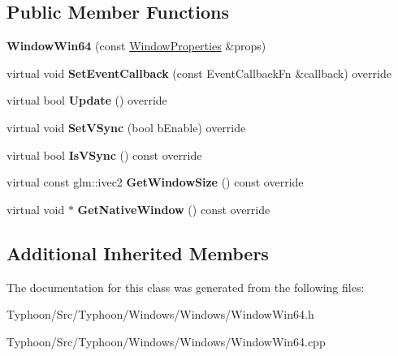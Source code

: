 \subsection*{Public Member Functions}
\begin{DoxyCompactItemize}
\item 
\mbox{\label{class_typhoon_engine_1_1_window_win64_a6f1eab7a91f37cfa49affaa9d3c53cb7}} 
{\bfseries Window\+Win64} (const \mbox{\hyperlink{struct_typhoon_engine_1_1_window_properties}{Window\+Properties}} \&props)
\item 
\mbox{\label{class_typhoon_engine_1_1_window_win64_a09ed336db951da85c24f7bdbe206a889}} 
virtual void {\bfseries Set\+Event\+Callback} (const Event\+Callback\+Fn \&callback) override
\item 
\mbox{\label{class_typhoon_engine_1_1_window_win64_ae700537b9fa361615d220761bedabacf}} 
virtual bool {\bfseries Update} () override
\item 
\mbox{\label{class_typhoon_engine_1_1_window_win64_ac1da978915106f1b733f5b6a83c62bd4}} 
virtual void {\bfseries Set\+V\+Sync} (bool b\+Enable) override
\item 
\mbox{\label{class_typhoon_engine_1_1_window_win64_a3899352b0bebac3b7e43d8279c819608}} 
virtual bool {\bfseries Is\+V\+Sync} () const override
\item 
\mbox{\label{class_typhoon_engine_1_1_window_win64_a0bee653f18b8d4a927b3758f4b65eca1}} 
virtual const glm\+::ivec2 {\bfseries Get\+Window\+Size} () const override
\item 
\mbox{\label{class_typhoon_engine_1_1_window_win64_af6b044bd05be143d38ff96b1a7c2a8f0}} 
virtual void $\ast$ {\bfseries Get\+Native\+Window} () const override
\end{DoxyCompactItemize}
\subsection*{Additional Inherited Members}


The documentation for this class was generated from the following files\+:\begin{DoxyCompactItemize}
\item 
Typhoon/\+Src/\+Typhoon/\+Windows/\+Windows/Window\+Win64.\+h\item 
Typhoon/\+Src/\+Typhoon/\+Windows/\+Windows/Window\+Win64.\+cpp\end{DoxyCompactItemize}
